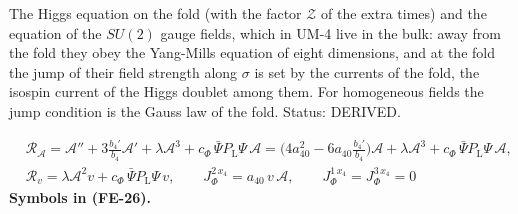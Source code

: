 \documentclass[
  10pt,
]{article}
\begin{document}
The Higgs equation on the fold (with the factor \(\mathcal{Z}\) of the
extra times) and the equation of the \(SU(2)\) gauge fields, which in
UM-4 live in the bulk: away from the fold they obey the Yang-Mills
equation of eight dimensions, and at the fold the jump of their field
strength along \(\sigma\) is set by the currents of the fold, the
isospin current of the Higgs doublet among them. For homogeneous fields
the jump condition is the Gauss law of the fold. Status: DERIVED.

\[
\begin{aligned}
&\mathcal{R}_{\mathcal{A}} = \mathcal{A}'' + 3\frac{b_4'}{b_4}\mathcal{A}' + \lambda\mathcal{A}^3 + c_\Phi\,\bar\Psi P_{\mathrm{L}}\Psi\,\mathcal{A}
 = \Big(4a_{40}^2 - 6a_{40}\frac{b_4'}{b_4}\Big)\mathcal{A} + \lambda\mathcal{A}^3 + c_\Phi\,\bar\Psi P_{\mathrm{L}}\Psi\,\mathcal{A},\\
&\mathcal{R}_v = \lambda\mathcal{A}^2v + c_\Phi\,\bar\Psi P_{\mathrm{L}}\Psi\,v,\qquad
 J_\Phi^{2\,x_4} = a_{40}\,v\,\mathcal{A},\qquad J_\Phi^{1\,x_4} = J_\Phi^{3\,x_4} = 0
\end{aligned} \tag{FE-26}
\] \textbf{Symbols in (FE-26).}
\end{document}
